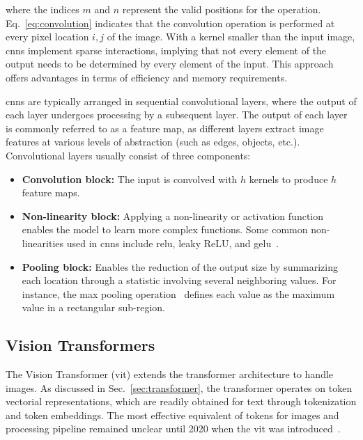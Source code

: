 where the indices $m$ and $n$ represent the valid positions for the operation. Eq.~\eqref{eq:convolution} indicates that the convolution operation is performed at every pixel location $i,j$ of the image. With a kernel smaller than the input image, \glspl{cnn} implement sparse interactions, implying that not every element of the output needs to be determined by every element of the input. This approach offers advantages in terms of efficiency and memory requirements.

\glspl{cnn} are typically arranged in sequential convolutional layers, where the output of each layer undergoes processing by a subsequent layer. The output of each layer is commonly referred to as a feature map, as different layers extract image features at various levels of abstraction (such as edges, objects, etc.). Convolutional layers usually consist of three components: 

\begin{itemize}
    \item \textbf{Convolution block:} The input is convolved with $h$ kernels to produce $h$ feature maps.

    \item \textbf{Non-linearity block:} Applying a non-linearity or activation function enables the model to learn more complex functions. Some common non-linearities used in \glspl{cnn} include \gls{relu}, leaky ReLU, and \gls{gelu}~\cite{dubey2022activation}.

    \item \textbf{Pooling block:} Enables the reduction of the output size by summarizing each location through a statistic involving several neighboring values. For instance, the max pooling operation~\cite{gholamalinezhad2020pooling} defines each value as the maximum value in a rectangular sub-region.
    
\end{itemize}





\subsection{Vision Transformers}
\label{subsec:vit}
The Vision Transformer (\gls{vit}) extends the transformer architecture to handle images. As discussed in Sec.~\ref{sec:transformer}, the transformer operates on token vectorial representations, which are readily obtained for text through tokenization and token embeddings. The most effective equivalent of tokens for images and processing pipeline remained unclear until 2020 when the \gls{vit} was introduced~\cite{dosovitskiy2020image}. 


